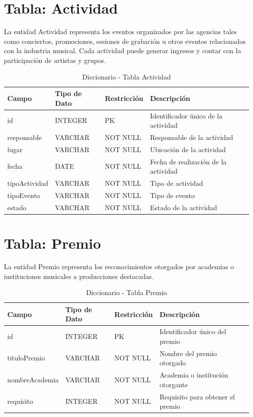 \documentclass[12pt,a4paper,spanish,oneside]{report}
\begin{document}
\section{Tabla: Actividad}
La entidad Actividad representa los eventos organizados por las agencias tales como conciertos, promociones, sesiones de grabación u otros eventos relacionados con la industria musical. Cada actividad puede generar ingresos y contar con la
participación de artistas y grupos.
\begin{table}[H]
\centering
\caption{Diccionario - Tabla Actividad}
\begin{tabular}{|l|l|l|l|l|}
\hline
\textbf{Campo} & \textbf{Tipo de Dato} & \textbf{Restricción} & \textbf{Descripción} \\
\hline
id & INTEGER  & PK & Identificador único de la actividad \\
\hline
responsable & VARCHAR & NOT NULL & Responsable de la actividad \\
\hline
lugar & VARCHAR & NOT NULL & Ubicación de la actividad  \\
\hline
fecha & DATE & NOT NULL & Fecha de realización de la actividad \\
\hline
tipoActividad & VARCHAR & NOT NULL & Tipo de actividad \\
\hline
tipoEvento & VARCHAR & NOT NULL & Tipo de evento \\
\hline
estado & VARCHAR & NOT NULL & Estado de la actividad \\
\hline
\end{tabular}
\end{table}

\section{Tabla: Premio}
La entidad Premio representa los reconocimientos otorgados por academias o instituciones musicales a producciones destacadas.
\begin{table}[H]
\centering
\caption{Diccionario - Tabla Premio}
\begin{tabular}{|l|l|l|l|l|}
\hline
\textbf{Campo} & \textbf{Tipo de Dato} & \textbf{Restricción} & \textbf{Descripción} \\
\hline
id & INTEGER & PK & Identificador único del premio \\
\hline
tituloPremio & VARCHAR & NOT NULL & Nombre del premio otorgado\\
\hline
nombreAcademia & VARCHAR & NOT NULL & Academia o institución otorgante \\
\hline
requisito & INTEGER & NOT NULL & Requisito para obtener el premio \\
\hline
\end{tabular}
\end{table}
\end{document}
